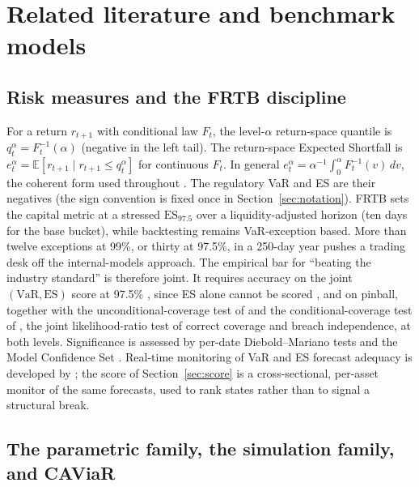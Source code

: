 \documentclass[11pt]{article}
\newcommand{\VaR}{\mathrm{VaR}}
\newcommand{\ES}{\mathrm{ES}}
\theoremstyle{remark}
\begin{document}
\section{Related literature and benchmark models}\label{sec:background}

\subsection{Risk measures and the FRTB discipline}

For a return $r_{t+1}$ with conditional law $F_t$, the level-$\alpha$
return-space quantile is $q_t^\alpha = F_t^{-1}(\alpha)$ (negative in
the left tail). The return-space Expected Shortfall is
$e_t^\alpha = \mathbb{E}[r_{t+1} \mid r_{t+1} \le q_t^\alpha]$ for continuous
$F_t$. In general $e_t^\alpha=\alpha^{-1}\!\int_0^\alpha F_t^{-1}(v)\,dv$, the
coherent form used throughout \citep{artzner1999, acerbitasche2002}.
The regulatory VaR and ES are their negatives (the sign convention is
fixed once in Section~\ref{sec:notation}). FRTB \citep{bcbs2019frtb} sets the capital metric at a stressed $\ES_{97.5}$ over a liquidity-adjusted horizon (ten days for the base bucket), while backtesting remains VaR-exception based. More than twelve exceptions at 99\%, or thirty at 97.5\%, in a 250-day year pushes a trading desk off the internal-models approach. The empirical bar for ``beating the industry standard'' is therefore joint. It requires accuracy on the joint $(\VaR,\ES)$ score at 97.5\% \citep{fissler2016, patton2019}, since ES alone cannot be scored \citep{gneiting2011}, and on pinball, together with the unconditional-coverage test of \citet{kupiec1995} and the conditional-coverage test of \citet{christoffersen1998}, the joint likelihood-ratio test of correct coverage and breach independence, at both levels. Significance is assessed by per-date Diebold--Mariano tests \citep{dieboldmariano1995} and the Model Confidence Set \citep{hansen2011mcs}. Real-time monitoring of VaR and ES forecast adequacy is developed by \citet{hoga2023monitoring}; the score of Section~\ref{sec:score} is a cross-sectional, per-asset monitor of the same forecasts, used to rank states rather than to signal a structural break.

\subsection{The parametric family, the simulation family, and CAViaR}
\end{document}
